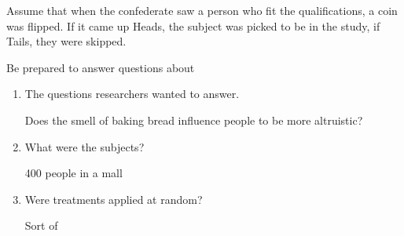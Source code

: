 Assume that when the confederate saw a person who fit the qualifications, a
coin was flipped. If it came up Heads, the subject was picked to be in
the study, if Tails, they were skipped.


 Be prepared to answer questions about 
\begin{enumerate}
\item  The questions researchers wanted to answer.
\begin{students}
 \vspace{.8cm}
\end{students}

\begin{key}
 Does the smell of baking bread influence people to be more altruistic?
\end{key}


\item What were the subjects?
\begin{students}
 \vspace{.8cm}
\end{students}

\begin{key}
 400 people in a mall
\end{key}



\item Were treatments applied at random?
\begin{students}
 \vspace{.8cm}
\end{students}

\begin{key}
Sort of
\end{key}

\end{enumerate}


